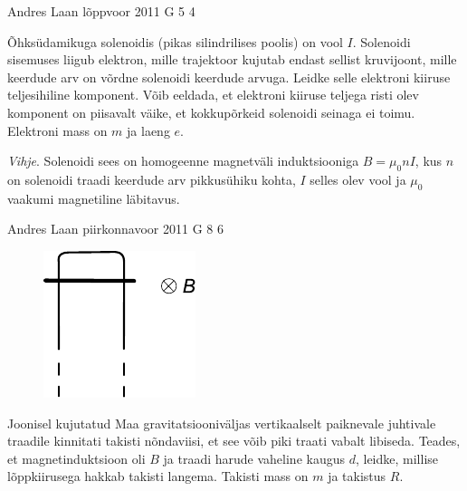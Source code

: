 \documentclass[11pt, twoside]{article}
\begin{document}
{%
{Andres Laan} %
{lõppvoor} %
{2011} %
{G 5} %
{4} %
{
\ifStatement
Õhksüdamikuga solenoidis (pikas silindrilises poolis) on vool
$I$. Solenoidi sisemuses liigub elektron, mille trajektoor kujutab endast sellist
kruvijoont, mille keerdude arv on võrdne solenoidi keerdude arvuga. Leidke
selle elektroni kiiruse teljesihiline komponent. Võib eeldada, et elektroni kiiruse teljega risti olev komponent on piisavalt väike, et kokkupõrkeid solenoidi
seinaga ei toimu. Elektroni mass on $m$ ja laeng $e$.

\emph{Vihje}. Solenoidi sees on
homogeenne magnetväli induktsiooniga $B = \mu_0nI$, kus $n$ on solenoidi traadi
keerdude arv pikkusühiku kohta, $I$ selles olev vool ja $\mu_0$ vaakumi magnetiline
läbitavus.
\fi
}

{Andres Laan} %
{piirkonnavoor} %
{2011} %
{G 8} %
{6} %
{
\ifStatement
\begin{figure}
	\vspace{-20pt}	
	\begin{center}
		\includegraphics[width=0.9\linewidth]{2011-v2g-08-yl}
	\end{center}
	\vspace{-20pt}
\end{figure}

Joonisel kujutatud Maa gravitatsiooniväljas vertikaalselt paiknevale juhtivale traadile kinnitati takisti nõndaviisi, et see võib piki traati vabalt libiseda. Teades, et magnetinduktsioon oli $B$ ja traadi harude vaheline kaugus $d$, leidke, millise lõppkiirusega hakkab takisti langema. Takisti mass on $m$ ja takistus $R$.
\fi
}

}
\end{document}

